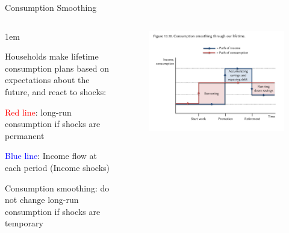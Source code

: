 \documentclass[11pt,aspectratio=43,usenames,dvipsnames]{beamer}
\newcommand{\red}[1]{\textcolor{red}{#1}}
\newcommand{\blue}[1]{\textcolor{blue}{#1}}
\let\olditemize=\itemize
\let\endolditemize=\enditemize
\renewenvironment{itemize}{\olditemize \itemsep1em}{\endolditemize}
\theoremstyle{definition}
\begin{document}
\begin{frame}{Consumption Smoothing}
\label{slide:Consumption_Smoothing}
    \begin{columns}
        \begin{column}{0.3\textwidth}
            \begin{itemize}
                \item<only@1> Households make lifetime consumption plans based on expectations about the future, and react to shocks:
                \item<only@2> \red{Red line}: long-run consumption if shocks are permanent
                \item<only@2> \blue{Blue line}: Income flow at each period (Income shocks)
                \item <only@3> Consumption smoothing: do not change long-run consumption if shocks are \alert{temporary}
            \end{itemize}
        \end{column}
        \begin{column}{0.7\textwidth}
            \begin{figure}
                \centering
                \includegraphics[width=\textwidth]{./figures/7.pdf}
            \end{figure}

        \end{column}
    \end{columns}

\end{frame}
\end{document}
